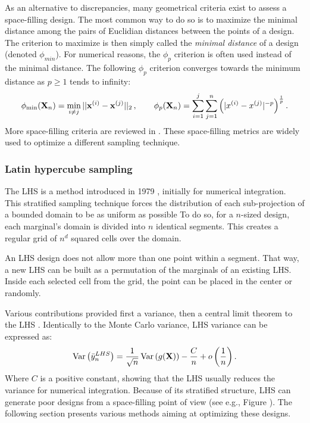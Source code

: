 As an alternative to discrepancies, many geometrical criteria exist to assess a space-filling design.
The most common way to do so is to maximize the minimal distance among the pairs of Euclidian distances between the points of a design.  
The criterion to maximize is then simply called the \textit{minimal distance} of a design (denoted $\phi_{min}$). 
For numerical reasons, the $\phi_p$ criterion is often used instead of the minimal distance. 
The following $\phi_p$ criterion converges towards the minimum distance as $p\geq1$ tends to infinity:
\begin{equation} 
    \phi_{\min}({\bf X}_n) = \min_{i \neq j} ||{\bf x}^{(i)} - {\bf x}^{(j)}||_2\, , \qquad
    \phi_p({\bf X}_n) = \sum_{i=1}^{j} \sum_{j=1}^{n} \left( |x^{(i)} - x^{(j)}|^{-p} \right)^{\frac{1}{p}}.
\end{equation}
More space-filling criteria are reviewed in \citet{abtini_2018}. 
These space-filling metrics are widely used to optimize a different sampling technique.


\subsubsection{Latin hypercube sampling}
The LHS is a method introduced in 1979 \citep{mckay_beckman_1979}, initially for numerical integration.
This stratified sampling technique forces the distribution of each sub-projection of a bounded domain to be as uniform as possible
To do so, for a $n$-sized design, each marginal's domain is divided into $n$ identical segments.
This creates a regular grid of $n^{d}$ squared cells over the domain. 

An LHS design does not allow more than one point within a segment. 
That way, a new LHS can be built as a permutation of the marginals of an existing LHS.
Inside each selected cell from the grid, the point can be placed in the center or randomly.

Various contributions provided first a variance, then a central limit theorem to the LHS \citep{owen_1996}.
Identically to the Monte Carlo variance, LHS variance can be expressed as:
\begin{equation}
    \operatorname{Var}\left(\Bar{y}_n^{LHS}\right) = \frac{1}{\sqrt{n}} \operatorname{Var}\left(g({\bf X})\right) - \frac{C}{n} + o\left( \frac1n \right). 
\end{equation}
Where $C$ is a positive constant, showing that the LHS usually reduces the variance for numerical integration. 
Because of its stratified structure, LHS can generate poor designs from a space-filling point of view (see e.g., Figure ). 
The following section presents various methods aiming at optimizing these designs.


